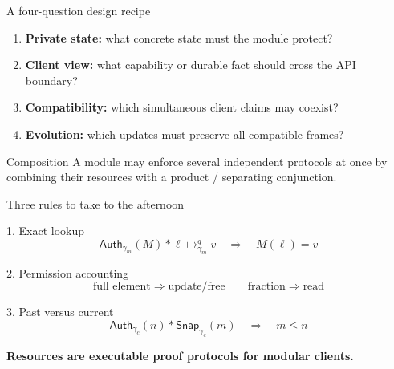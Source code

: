 \documentclass[aspectratio=169,10pt]{beamer}
\newcommand{\Sep}{\mathbin{*}}
\newcommand{\AuthM}[1]{\mathsf{Auth}_{\gamma_m}(#1)}
\newcommand{\AuthC}[1]{\mathsf{Auth}_{\gamma_c}(#1)}
\newcommand{\Snap}[1]{\mathsf{Snap}_{\gamma_c}(#1)}
\newcommand{\ptfrac}[3]{#1\mathrel{\mapsto_{\gamma_m}^{#2}}#3}
\begin{document}
\begin{frame}{A four-question design recipe}
  \begin{enumerate}
    \item \textbf{Private state:} what concrete state must the module protect?
    \item \textbf{Client view:} what capability or durable fact should cross the API boundary?
    \item \textbf{Compatibility:} which simultaneous client claims may coexist?
    \item \textbf{Evolution:} which updates must preserve all compatible frames?
  \end{enumerate}

  \vspace{0.45cm}
  \begin{center}
  \end{center}

  \begin{block}{Composition}
    A module may enforce several independent protocols at once by combining their resources with a product / separating conjunction.
  \end{block}
\end{frame}

\begin{frame}{Three rules to take to the afternoon}
  \begin{block}{1. Exact lookup}
    \[
      \AuthM{M}\Sep\ptfrac{\ell}{q}{v}\quad\Longrightarrow\quad M(\ell)=v
    \]
  \end{block}
  \begin{block}{2. Permission accounting}
    \[
      \text{full element}\Rightarrow\text{update/free}
      \qquad
      \text{fraction}\Rightarrow\text{read}
    \]
  \end{block}
  \begin{block}{3. Past versus current}
    \[
      \AuthC{n}\Sep\Snap{m}\quad\Longrightarrow\quad m\le n
    \]
  \end{block}

  \begin{center}
    \Large\bfseries\color{CrisNavy}
    Resources are executable proof protocols for modular clients.
  \end{center}
\end{frame}
\end{document}
